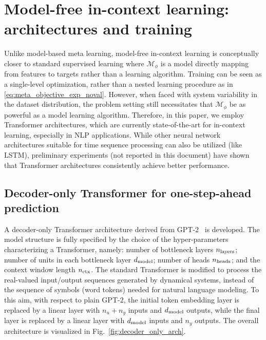\documentclass{article}
\newcommand{\free}{\mathcal{M}}
\begin{document}
\section{Model-free in-context learning: architectures and training}
\label{sec:train}

Unlike model-based meta learning, model-free in-context learning is conceptually closer  
to standard supervised learning where $\free_\phi$ is  a model directly mapping from features to targets rather than a learning algorithm. %
Training can be seen as a single-level optimization, rather than a nested learning procedure as in 	\eqref{eq:meta_objective_exp_noval}.
However, when faced with system variability in the dataset distribution, the problem setting still necessitates that $\free_\phi$ be as powerful as a model learning algorithm. Therefore, in this paper, we employ Transformer architectures, which are currently state-of-the-art for in-context learning, especially in NLP applications. While other neural network architectures suitable for time sequence processing can also be utilized (like LSTM), preliminary   experiments (not reported in this document) have shown that  Transformer architectures consistently achieve better performance.




\subsection{Decoder-only Transformer for one-step-ahead prediction} \label{sec:train_onestep}

 A  decoder-only Transformer architecture derived from GPT-2~\cite{radford2019language} is developed.
 The model structure is fully specified by the choice of the hyper-parameters characterizing a Transformer, namely:  number of bottleneck layers $n_{\rm layers}$; number of units in each bottleneck layer $d_{\rm model}$; number of heads $n_{\rm heads}$; and the context window length $n_{\rm ctx}$. 
The standard Transformer   is modified to process the real-valued input/output sequences generated by dynamical systems, instead of the sequence of symbols (word tokens) needed for natural language modeling. To this aim, with respect to plain GPT-2, the initial token embedding layer is replaced by a linear layer with $n_u+n_y$ inputs and $d_{\rm model}$ outputs, while the final layer is replaced by a linear layer with $d_{\rm model}$ inputs and $n_y$ outputs. 
The overall architecture is visualized in Fig.~\ref{fig:decoder_only_arch}. 
\end{document}
